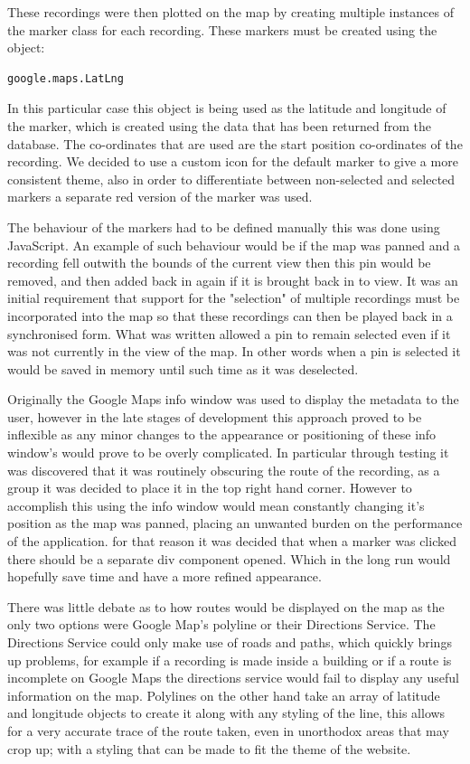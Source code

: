 \documentclass{l3proj}
\begin{document}
These recordings were then plotted on the map by creating multiple instances of the marker class for each recording. These markers must be created using the object:
\begin{verbatim}
google.maps.LatLng
\end{verbatim}
In this particular case this object is being used as the latitude and longitude of the marker, which is created using the data that has been returned from the database. The co-ordinates that are used are the start position co-ordinates of the recording. We decided to use a custom icon for the default marker to give a more consistent theme, also in order to differentiate between non-selected and selected markers a separate red version of the marker was used.

The behaviour of the markers had to be defined manually this was done using \gls{JavaScript}. An example of such behaviour would be if the map was panned and a recording fell outwith the bounds of the current view then this pin would be removed, and then added back in again if it is brought back in to view. It was an initial requirement that support for the "selection" of multiple recordings must be incorporated into the map so that these recordings can then be played back in a synchronised form. What was written allowed a pin to remain selected even if it was not currently in the view of the map. In other words when a pin is selected it would be saved in memory until such time as it was deselected.

Originally the Google Maps info window was used to display the metadata to the user, however in the late stages of development this approach proved to be inflexible as any minor changes to the appearance or positioning of these info window’s would prove to be overly complicated. In particular through testing it was discovered that it was routinely obscuring the route of the recording, as a group it was decided to place it in the top right hand corner. However to accomplish this using the info window would mean constantly changing it's position as the map was panned, placing an unwanted burden on the performance of the application. for that reason it was decided that when a marker was clicked there should be a separate div component opened. Which in the long run would hopefully save time and have a more refined appearance.

There was little debate as to how routes would be displayed on the map as the only two options were Google Map's polyline or their Directions Service. The Directions Service could only make use of roads and paths, which quickly brings up problems, for example if a recording is made inside a building or if a route is incomplete on Google Maps the directions service would fail to display any useful information on the map. Polylines on the other hand take an array of latitude and longitude objects to create it along with any styling of the line, this allows for a very accurate trace of the route taken, even in unorthodox areas that may crop up; with a styling that can be made to fit the theme of the website.
\end{document}
